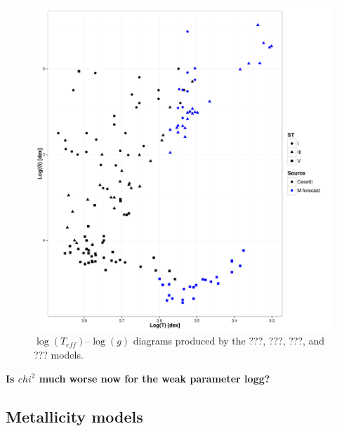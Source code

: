 \begin{figure}
 \begin{center}
 \includegraphics[width=12cm]{figs/irtf-logg-knn-oo.pdf}
 \caption{$\log(T_{eff})$--$\log(g)$ diagrams produced by the ???,
   ???, ???, and ??? models.}
 \label{fig:lt_lg_ga}
 \end{center}
\end{figure}

{\bf Is $chi^2$ much worse now for the weak parameter logg?}

\subsection{Metallicity models} 

